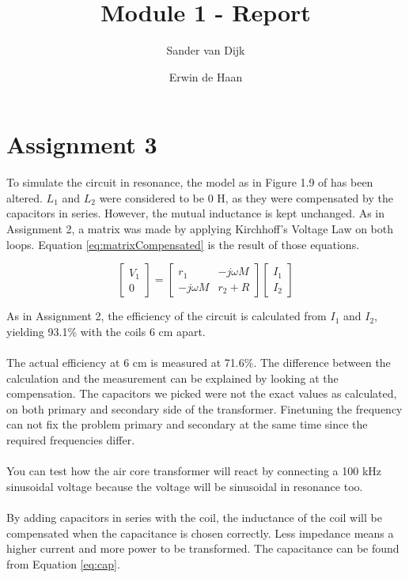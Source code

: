 \documentclass[final]{scrreprt} %
\title{Module 1 - Report}
\author{Sander {van Dijk} \and Erwin {de Haan}}
\begin{document}
\chapter*{Assignment 3}

To simulate the circuit in resonance, the model as in Figure 1.9 of \cite{epo4-manual} has been altered. $L_1$ and $L_2$ were considered to be 0 H, as they were compensated by the capacitors in series. However, the mutual inductance is kept unchanged. As in Assignment 2, a matrix was made by applying Kirchhoff's Voltage Law on both loops. Equation \ref{eq:matrixCompensated} is the result of those equations.

\begin{equation}
	\begin{bmatrix}
		V_1 \\
		0
	\end{bmatrix} =
	\begin{bmatrix}
		 r_1 & -j \omega M \\
		-j \omega M & r_2 + R
	\end{bmatrix}
	\begin{bmatrix}
		I_1 \\
		I_2
	\end{bmatrix}
	\label{eq:matrixCompensated}
\end{equation}

As in Assignment 2, the efficiency of the circuit is calculated from $I_1$ and $I_2$, yielding 93.1\% with the coils 6 cm apart.
\\ \\
The actual efficiency at 6 cm is measured at 71.6\%.
The difference between the calculation and the measurement can be explained by looking at the compensation.
The capacitors we picked were not the exact values as calculated, on both primary and secondary side of the transformer.
Finetuning the frequency can not fix the problem primary and secondary at the same time since the required frequencies differ.
\\ \\
You can test how the air core transformer will react by connecting a 100 kHz sinusoidal voltage because the voltage will be sinusoidal in resonance too.
\\ \\ 
By adding capacitors in series with the coil, the inductance of the coil will be compensated when the capacitance is chosen correctly. Less impedance means a higher current and more power to be transformed. The capacitance can be found from Equation \ref{eq:cap}.
\end{document}
